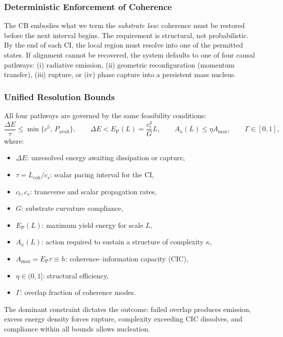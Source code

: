 \documentclass[preprints,article,submit,pdftex,moreauthors]{Definitions/mdpi}
\begin{document}
\subsubsection*{Deterministic Enforcement of Coherence}

The CB embodies what we term the \emph{substrate law}: coherence must be restored before the next interval begins. The requirement is structural, not probabilistic. By the end of each CI, the local region must resolve into one of the permitted states. If alignment cannot be recovered, the system defaults to one of four causal pathways: (i) radiative emission, (ii) geometric reconfiguration (momentum transfer), (iii) rupture, or (iv) phase capture into a persistent mass nucleus.

\subsubsection*{Unified Resolution Bounds}

All four pathways are governed by the same feasibility conditions:
\begin{equation}
\frac{\Delta E}{\tau} \leq \min\{c^5,\,P_{\text{avail}}\}, \qquad
\Delta E < E_{\mathrm{P}}(L) = \frac{c_t^4}{G}L, \qquad
A_\kappa(L) \leq \eta A_{\max}, \qquad
\Gamma \in [0,1],
\end{equation}
where:
\begin{itemize}
    \item \( \Delta E \): unresolved energy awaiting dissipation or capture,
    \item \( \tau = L_{\mathrm{coh}} / c_s \): scalar pacing interval for the CI,
    \item \( c_t, c_s \): transverse and scalar propagation rates,
    \item \( G \): substrate curvature compliance,
    \item \( E_{\mathrm{P}}(L) \): maximum yield energy for scale \( L \),
    \item \( A_\kappa(L) \): action required to sustain a structure of complexity \( \kappa \),
    \item \( A_{\max} = E_{\mathrm{P}}\tau \equiv h \): coherence–information capacity (CIC),
    \item \( \eta \in (0,1] \): structural efficiency,
    \item \( \Gamma \): overlap fraction of coherence modes.
\end{itemize}

The dominant constraint dictates the outcome: failed overlap produces emission, excess energy density forces rupture, complexity exceeding CIC dissolves, and compliance within all bounds allows nucleation.
\end{document}
